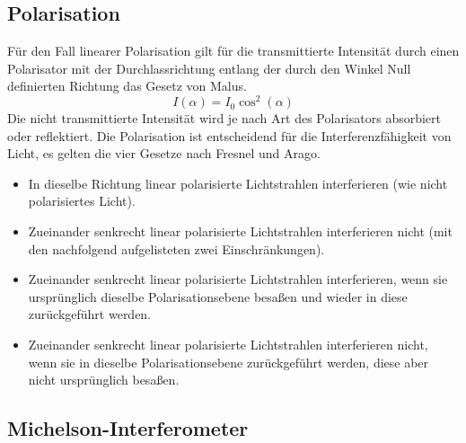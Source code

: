 \documentclass[ngerman]{scrartcl}
\begin{document}
\subsection{Polarisation}
\label{sec:grundlagen_polarisation}

Für den Fall linearer Polarisation gilt für die transmittierte Intensität durch einen Polarisator mit der Durchlassrichtung entlang der durch den Winkel Null definierten Richtung das Gesetz von Malus.
\begin{equation}
    \label{eq:malus}
    I(\alpha) = I_0 \cos^2(\alpha)
\end{equation}
Die nicht transmittierte Intensität wird je nach Art des Polarisators absorbiert oder reflektiert. Die Polarisation ist entscheidend für die Interferenzfähigkeit von Licht, es gelten die vier Gesetze nach Fresnel und Arago.
\begin{framed}
    \begin{itemize}
        \item In dieselbe Richtung linear polarisierte Lichtstrahlen interferieren (wie nicht polarisiertes Licht).
        \item Zueinander senkrecht linear polarisierte Lichtstrahlen interferieren nicht (mit den nachfolgend aufgelisteten zwei Einschränkungen).
        \item Zueinander senkrecht linear polarisierte Lichtstrahlen interferieren, wenn sie ursprünglich dieselbe Polarisationsebene besaßen und wieder in diese zurückgeführt werden.
        \item  Zueinander senkrecht linear polarisierte Lichtstrahlen interferieren nicht, wenn sie in dieselbe Polarisationsebene zurückgeführt werden, diese aber nicht ursprünglich besaßen.
    \end{itemize}
\end{framed}

\subsection{Michelson-Interferometer}
\label{sec:grundlagen_michelson_interferometer}
\end{document}
